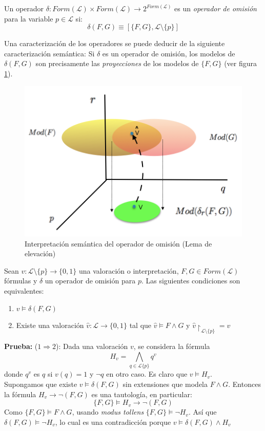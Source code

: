  Un operador $\delta :Form(\mathcal{L}) \times Form(\mathcal{L}) \longrightarrow 2^{Form(\mathcal{L})}$ es un \textit{operador de omisión} para la variable $p \in \mathcal{L}$ si:
$$\delta (F,G) \equiv [\{F,G\}, \mathcal{L} \setminus \{p\}]$$

Una caracterización de los operadores se puede deducir de la siguiente caracterización semántica: Si  $\delta$ es un operador de omisión, los modelos de $\delta (F,G)$ son precisamente las \textit{proyecciones} de los modelos de $\{ F,G \}$ (ver figura \ref{fig:proy}). 

\vspace{0.5cm}
\begin{figure}[h]
	\centering
		\includegraphics[scale=0.6]{imagenes/indemod.png}
	\caption{Interpretación semántica del operador de omisión (Lema de elevación)}
	\label{fig:proy}
\end{figure}
\vspace{0.5cm}

\lem Sean $v :\mathcal{L} \setminus \{p\} \rightarrow \{ 0,1 \}$ una valoración o interpretación, $F, G \in Form(\mathcal{L})$ fórmulas y $\delta$ un operador de omisión para $p$. Las siguientes condiciones son equivalentes:
\begin{enumerate}
\item $v \vDash \delta (F,G)$
\item Existe una valoración $\hat{v} : \mathcal{L} \rightarrow \{ 0,1 \}$ tal que $\hat{v} \vDash F \wedge G$ y $\hat{v} \upharpoonright_{\mathcal{L} \setminus \{ p \}} = v $
\end{enumerate}

\noindent \textbf{Prueba: } ($1 \Rightarrow 2$): Dada una valoración $v$, se considera la fórmula 
$$H_v = \bigwedge_{q \in \mathcal{L} \{ p \}} q^v$$
donde $q^v$ es $q$ si $v(q)=1$ y $\neg q$ en otro caso. Es claro que $v \vDash H_v$. \\
Supongamos que existe $v \vDash \delta (F,G)$ sin extensiones que modela $F \wedge G$. Entonces la fórmula $H_v \rightarrow \neg (F,G)$ es una tautología, en particular:
$$ \{ F,G \} \vDash H_v \rightarrow \neg (F,G)$$
Como $ \{ F,G \} \vDash F \wedge G$, usando \textit{modus tollens} $\{ F,G \} \vDash \neg H_v$. Así que $\delta (F,G) \vDash \neg H_v$, lo cual es una contradicción porque $v \vDash \delta (F,G) \wedge H_v$
